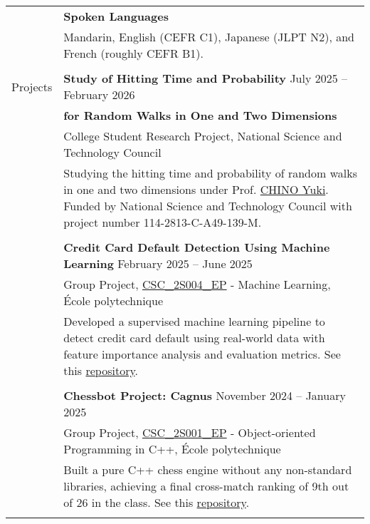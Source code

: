 \documentclass[letterpaper, 11pt]{article}
\begin{document}
\begin{center}
\begin{longtable}{p{0.76in}p{5.93in}}
        & \textbf{Spoken Languages} \\
        & Mandarin, English (CEFR C1), Japanese (JLPT N2), and French (roughly CEFR B1).\\
        & \\

        

        {\textcolor{OliveGreen}{Projects}} & \textbf{Study of Hitting Time and Probability} \hfill July 2025 -- February 2026\\
        & \textbf{\quad \quad \quad for Random Walks in One and Two Dimensions} \\
        & College Student Research Project, National Science and Technology Council\\
        & Studying the hitting time and probability of random walks in one and two dimensions under Prof. \href{https://scholar.nycu.edu.tw/en/persons/yuki-chino}{CHINO Yuki}. Funded by National Science and Technology Council with project number 114-2813-C-A49-139-M.\\
        & \\
        

        & \textbf{Credit Card Default Detection Using Machine Learning} \hfill February 2025 -- June 2025\\
        & Group Project, \href{https://synapses.polytechnique.fr/catalogue/2024-2025/ue/47/CSC-2S004-EP-machine-learning?from=D12}{CSC\_2S004\_EP} - Machine Learning, École polytechnique\\
        & Developed a supervised machine learning pipeline to detect credit card default using real-world data with feature importance analysis and evaluation metrics. See this \href{https://github.com/eiken59/ml_project/blob/main/README.md}{repository}.\\
        & \\

        & \textbf{Chessbot Project: Cagnus} \hfill November 2024 -- January 2025\\
        & Group Project, \href{https://synapses.polytechnique.fr/catalogue/2024-2025/ue/32/CSC-2F001-EP-object-oriented-programming-in-c?from=D12}{CSC\_2S001\_EP} - Object-oriented Programming in C++, École polytechnique\\
        & Built a pure C++ chess engine without any non-standard libraries, achieving a final cross-match ranking of 9th out of 26 in the class. See this \href{https://github.com/jetzypetz/chess_bot/blob/main/docs/README.md}{repository}.\\
        & \\
        

\end{longtable}
\end{center}
\end{document}

